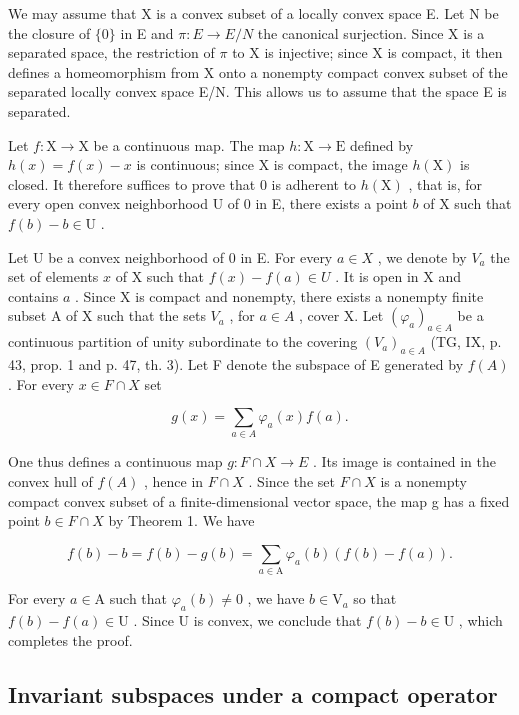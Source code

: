 We may assume that X is a convex subset of a locally convex space E. Let N be the closure of \(\{0\}\) in E and \(\pi: E \rightarrow E/N\) the canonical surjection. Since X is a separated space, the restriction of \(\pi\) to X is injective; since X is compact, it then defines a homeomorphism from X onto a nonempty compact convex subset of the separated locally convex space E/N. This allows us to assume that the space E is separated.

Let \(f: \mathrm{X} \to \mathrm{X}\) be a continuous map. The map \(h: \mathrm{X} \to \mathrm{E}\) defined by \(h(x) = f(x) - x\) is continuous; since X is compact, the image \(h(\mathrm{X})\) is closed. It therefore suffices to prove that 0 is adherent to \(h(\mathrm{X})\) , that is, for every open convex neighborhood U of 0 in E, there exists a point \(b\) of X such that \(f(b) - b \in \mathrm{U}\) .

Let U be a convex neighborhood of 0 in E. For every \(a \in X\) , we denote by \(V_a\) the set of elements \(x\) of X such that \(f(x) - f(a) \in U\) . It is open in X and contains \(a\) . Since X is compact and nonempty, there exists a nonempty finite subset A of X such that the sets \(V_a\) , for \(a \in A\) , cover X. Let \((\varphi_a)_{a \in A}\) be a continuous partition of unity subordinate to the covering \((V_a)_{a \in A}\) (TG, IX, p. 43, prop. 1 and p. 47, th. 3). Let F denote the subspace of E generated by \(f(A)\) . For every \(x \in F \cap X\) set

\[
g (x) = \sum_ {a \in A} \varphi_ {a} (x) f (a).
\]

One thus defines a continuous map \(g: F \cap X \to E\) . Its image is contained in the convex hull of \(f(A)\) , hence in \(F \cap X\) . Since the set \(F \cap X\) is a nonempty compact convex subset of a finite-dimensional vector space, the map g has a fixed point \(b \in F \cap X\) by Theorem 1. We have

\[
f (b) - b = f (b) - g (b) = \sum_ {a \in \mathrm{A}} \varphi_ {a} (b) (f (b) - f (a)).
\]

For every \(a \in \mathrm{A}\) such that \(\varphi_{a}(b) \neq 0\) , we have \(b \in \mathrm{V}_{a}\) so that \(f(b) - f(a) \in \mathrm{U}\) . Since U is convex, we conclude that \(f(b) - b \in \mathrm{U}\) , which completes the proof.

\subsection{Invariant subspaces under a compact operator}

